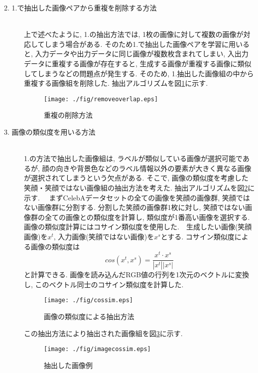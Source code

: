\begin{description}
\item[2. 1.で抽出した画像ペアから重複を削除する方法]\mbox{}\\ 
上で述べたように, 1.の抽出方法では, 1枚の画像に対して複数の画像が対応してしまう場合がある. そのため1.で抽出した画像ペアを学習に用いると, 入力データや出力データに同じ画像が複数枚含まれてしまい,  入出力データに重複する画像が存在すると, 生成する画像が重複する画像に類似してしまうなどの問題点が発生する. そのため, 1.抽出した画像組の中から重複する画像組を削除した. 抽出アルゴリズムを図\ref{fig:removeoverlap}に示す. 
\begin{figure}[H]
 	\begin{center}
 		\texttt{[image: ./fig/removeoverlap.eps]}
 		\caption{重複の削除方法}
 		\label{fig:removeoverlap}
 	\end{center}
 \end{figure}

\item[3. 画像の類似度を用いる方法]\mbox{}\\ 
1.の方法で抽出した画像組は, ラベルが類似している画像が選択可能であるが, 顔の向きや背景色などのラベル情報以外の要素が大きく異なる画像が選択されてしまうという欠点がある. そこで, 画像の類似度を考慮した笑顔・笑顔ではない画像組の抽出方法を考えた. 抽出アルゴリズムを図\ref{fig:cossim}に示す. 　まずCelebAデータセットの全ての画像を笑顔の画像群, 笑顔ではない画像群に分割する. 分割した笑顔の画像群1枚に対し, 笑顔ではない画像群の全ての画像との類似度を計算し, 類似度が1番高い画像を選択する. 画像の類似度計算にはコサイン類似度を使用した.　生成したい画像(笑顔画像)を$x^t$, 入力画像(笑顔ではない画像)を$x^s$とする. コサイン類似度による画像の類似度は
\begin{equation}
  cos(x^t, x^s) = \frac{x^t \cdot x^s}{|x^t||x^s|}
\end{equation}
と計算できる.
画像を読み込んだRGB値の行列を1次元のベクトルに変換し, このベクトル同士のコサイン類似度を計算した. 
\begin{figure}[H]
 	\begin{center}
 		\texttt{[image: ./fig/cossim.eps]}
 		\caption{画像の類似度による抽出方法}
 		\label{fig:cossim}
 	\end{center}
 \end{figure}

この抽出方法により抽出された画像組を図\ref{fig:imagecossim}に示す. 
\begin{figure}[H]
 	\begin{center}
 		\texttt{[image: ./fig/imagecossim.eps]}
 		\caption{抽出した画像例}
 		\label{fig:imagecossim}
 	\end{center}
 \end{figure}


\end{description}
